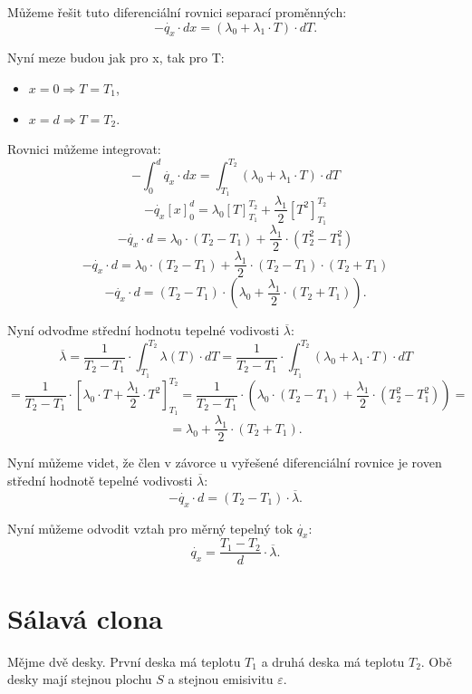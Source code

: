 \documentclass{article}
\begin{document}
Můžeme řešit tuto diferenciální rovnici separací proměnných:
$$
    - \dot{q_x} \cdot dx = \left( \lambda_0 + \lambda_1 \cdot T \right) \cdot dT.
$$

Nyní meze budou jak pro x, tak pro T:
\begin{itemize}
    \item $x = 0 \Rightarrow T = T_1$,
    \item $x = d \Rightarrow T = T_2$.
\end{itemize}

Rovnici můžeme integrovat:
$$
    - \int_{0}^{d} \dot{q_x} \cdot dx = \int_{T_1}^{T_2} \left( \lambda_0 + \lambda_1 \cdot T \right) \cdot dT
$$
$$
    - \dot{q_x} \left[ x \right]_{0}^{d} = \lambda_0 \left[ T \right]_{T_1}^{T_2} + \frac{\lambda_1}{2} \left[ T^2 \right]_{T_1}^{T_2}
$$
$$
    - \dot{q_x} \cdot d = \lambda_0 \cdot (T_2 - T_1) + \frac{\lambda_1}{2} \cdot (T_2^2 - T_1^2)
$$
$$
    - \dot{q_x} \cdot d = \lambda_0 \cdot (T_2 - T_1) + \frac{\lambda_1}{2} \cdot (T_2 - T_1) \cdot (T_2 + T_1)
$$
$$
    - \dot{q_x} \cdot d = (T_2 - T_1) \cdot \left( \lambda_0 + \frac{\lambda_1}{2} \cdot (T_2 + T_1) \right).
$$

Nyní odvoďme střední hodnotu tepelné vodivosti $\overline{\lambda}$:
$$
    \overline{\lambda} = \frac{1}{T_2 - T_1} \cdot \int_{T_1}^{T_2} \lambda (T) \cdot dT = \frac{1}{T_2 - T_1} \cdot \int_{T_1}^{T_2} \left( \lambda_0 + \lambda_1 \cdot T \right) \cdot dT
$$
$$
    = \frac{1}{T_2 - T_1} \cdot \left[ \lambda_0 \cdot T + \frac{\lambda_1}{2} \cdot T^2 \right]_{T_1}^{T_2} = \frac{1}{T_2 - T_1} \cdot \left( \lambda_0 \cdot (T_2 - T_1) + \frac{\lambda_1}{2} \cdot (T_2^2 - T_1^2) \right) =
$$
$$
    = \lambda_0 + \frac{\lambda_1}{2} \cdot (T_2 + T_1).
$$

Nyní můžeme videt, že člen v závorce u vyřešené diferenciální rovnice je roven střední hodnotě tepelné vodivosti $\overline{\lambda}$:
$$
    - \dot{q_x} \cdot d = (T_2 - T_1) \cdot \overline{\lambda}.
$$

Nyní můžeme odvodit vztah pro měrný tepelný tok $\dot{q_x}$:
$$
    \dot{q_x} = \frac{T_1 - T_2}{d} \cdot \overline{\lambda}.
$$

\newpage



\section{ Sálavá clona \spicy \spicy}
Mějme dvě desky. První deska má teplotu $T_1$ a druhá deska má teplotu $T_2$. Obě desky mají stejnou plochu $S$ a stejnou emisivitu $\varepsilon$.
\end{document}
